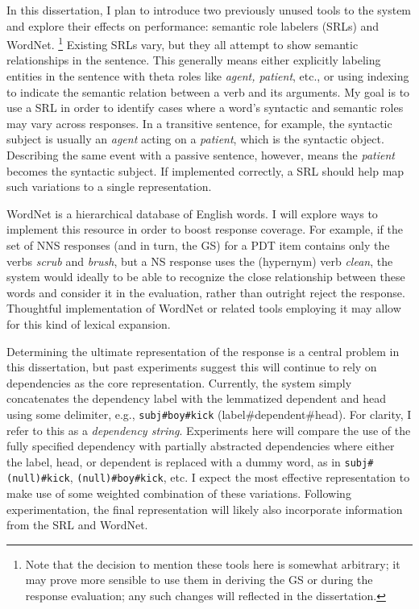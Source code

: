 \documentclass[11pt]{article}
\begin{document}
In this dissertation, I plan to introduce two previously unused tools to the system and explore their effects on performance: semantic role labelers (SRLs) and WordNet. \footnote{Note that the decision to mention these tools here is somewhat arbitrary; it may prove more sensible to use them in deriving the GS or during the response evaluation; any such changes will reflected in the dissertation.} Existing SRLs vary, but they all attempt to show semantic relationships in the sentence. This generally means either explicitly labeling entities in the sentence with theta roles like \textit{agent, patient}, etc., or using indexing to indicate the semantic relation between a verb and its arguments. My goal is to use a SRL in order to identify cases where a word's syntactic and semantic roles may vary across responses. In a transitive sentence, for example, the syntactic subject is usually an \textit{agent} acting on a \textit{patient}, which is the syntactic object. Describing the same event with a passive sentence, however, means the \textit{patient} becomes the syntactic subject. If implemented correctly, a SRL should help map such variations to a single representation.
\par
WordNet is a hierarchical database of English words. I will explore ways to implement this resource in order to boost response coverage. For example, if the set of NNS responses (and in turn, the GS) for a PDT item contains only the verbs \textit{scrub} and \textit{brush}, but a NS response uses the (hypernym) verb \textit{clean}, the system would ideally to be able to recognize the close relationship between these words and consider it in the evaluation, rather than outright reject the response. Thoughtful implementation of WordNet or related tools employing it may allow for this kind of lexical expansion.
\par
Determining the ultimate representation of the response is a central problem in this dissertation, but past experiments suggest this will continue to rely on dependencies as the core representation.  Currently, the system simply concatenates the dependency label with the lemmatized dependent and head using some delimiter, e.g., \texttt{subj\#boy\#kick} (label\#dependent\#head). For clarity, I refer to this as a \textit{dependency string}. Experiments here will compare the use of the fully specified dependency with partially abstracted dependencies where either the label, head, or dependent is replaced with a dummy word, as in \texttt{subj\#(null)\#kick}, \texttt{(null)\#boy\#kick}, etc. I expect the most effective representation to make use of some weighted combination of these variations. Following experimentation, the final representation will likely also incorporate information from the SRL and WordNet.\\
\end{document}
